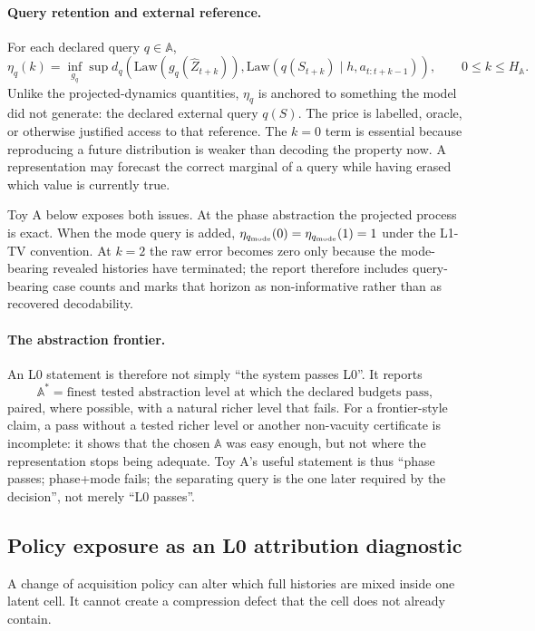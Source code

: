 \documentclass[10pt]{article}
\newcommand{\Aabs}{\mathbb A}
\begin{document}
\paragraph{Query retention and external reference.}
For each declared query $q\in\Aabs$,
\[
\eta_q(k)
=
\inf_{g_q}\sup
 d_q\!\left(
\mathrm{Law}(g_q(\hat Z_{t+k})),
\mathrm{Law}(q(S_{t+k})\mid h,a_{t:t+k-1})
\right),
\qquad 0\le k\le H_{\Aabs}.
\]
Unlike the projected-dynamics quantities, $\eta_q$ is anchored to something the model did not generate: the declared external query $q(S)$. The price is labelled, oracle, or otherwise justified access to that reference. The $k=0$ term is essential because reproducing a future distribution is weaker than decoding the property now. A representation may forecast the correct marginal of a query while having erased which value is currently true.

Toy A below exposes both issues. At the phase abstraction the projected process is exact. When the mode query is added, $\eta_{q_{\rm mode}}(0)=\eta_{q_{\rm mode}}(1)=1$ under the L1-TV convention. At $k=2$ the raw error becomes zero only because the mode-bearing revealed histories have terminated; the report therefore includes query-bearing case counts and marks that horizon as non-informative rather than as recovered decodability.

\paragraph{The abstraction frontier.}
An L0 statement is therefore not simply ``the system passes L0''. It reports
\[
\Aabs^*=\text{finest tested abstraction level at which the declared budgets pass},
\]
paired, where possible, with a natural richer level that fails. For a frontier-style claim, a pass without a tested richer level or another non-vacuity certificate is incomplete: it shows that the chosen $\Aabs$ was easy enough, but not where the representation stops being adequate. Toy A's useful statement is thus ``phase passes; phase+mode fails; the separating query is the one later required by the decision'', not merely ``L0 passes''.

\subsection{Policy exposure as an L0 attribution diagnostic}

A change of acquisition policy can alter which full histories are mixed inside one latent cell. It cannot create a compression defect that the cell does not already contain.
\end{document}
